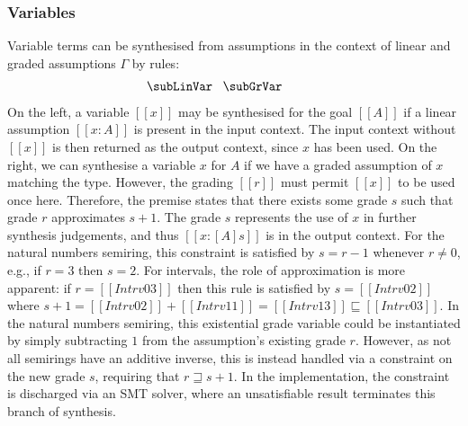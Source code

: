   \subsubsection{Variables}
Variable terms can be synthesised from assumptions in the context of linear and
graded assumptions $\Gamma$ by rules:
  \begin{align*}
    \begin{array}{c}
  \hspace{-3em}\subLinVar
  \;\;\;
  \subGrVar
    \end{array}
  \end{align*}
%
On the left, a variable $[[x]]$ may be synthesised for the goal
$[[ A ]]$ if a linear assumption $[[ x : A ]]$ is present
  in the input context. The input context without $[[x]]$ is then returned as
  the output context, since $x$ has been used. On the right,
  we can synthesise a variable $x$ for $A$ if we have a graded
  assumption of $x$ matching the type. However, %
  the grading $[[ r ]]$ must permit $[[ x ]]$ to be used once here. Therefore,
  the premise states that there exists some grade $s$ such that grade $r$
  approximates $s + 1$. The grade $s$ represents the use of $x$ in further
  synthesis judgements, and thus $[[ x : [ A ] s ]]$ is in the output context.
  For the natural numbers semiring, this constraint is satisfied by $s = r - 1$
  whenever $r \neq 0$, e.g., if $r = 3$ then $s = 2$. For intervals, the role of
  approximation is more apparent: if $r = [[ Intrv 0 3]]$ then this rule is
  satisfied by $s = [[ Intrv 0 2 ]]$ where $s + 1 = [[ Intrv 0 2 ]] + [[ Intrv 1
  1 ]] = [[ Intrv 1 3 ]] \sqsubseteq [[ Intrv 0 3 ]]$. In the natural numbers
  semiring, this existential grade variable could be instantiated by simply
  subtracting $1$ from the assumption's existing grade $r$. However, as not all
  semirings have an additive inverse, this is instead handled via a constraint
  on the new grade $s$, requiring that $ r \sqsupseteq s + 1 $. In the
  implementation, the constraint is discharged via an SMT solver, where an
  unsatisfiable result terminates this branch of synthesis.


